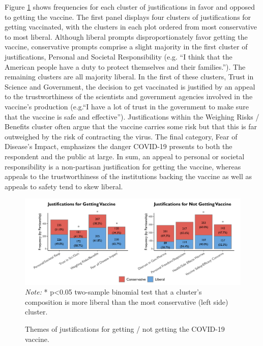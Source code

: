 \documentclass{article} %
\begin{document}
Figure \ref{fig:partisan5} shows frequencies for each cluster of justifications in favor
and opposed to getting the vaccine. The first panel displays four
clusters of justifications for getting vaccinated, with the clusters in
each plot ordered from most conservative to most liberal. Although
liberal prompts disproportionately favor getting the vaccine,
conservative prompts comprise a slight majority in the first cluster of
justifications, Personal and Societal Responsibility (e.g. ``I think
that the American people have a duty to protect themselves and their
families.''). The remaining clusters are all majority liberal. In the
first of these clusters, Trust in Science and Government, the decision
to get vaccinated is justified by an appeal to the trustworthiness of
the scientists and government agencies involved in the vaccine's
production (e.g.``I have a lot of trust in the government to make sure
that the vaccine is safe and effective''). Justifications within the
Weighing Risks / Benefits cluster often argue that the vaccine carries
some risk but that this is far outweighed by the risk of contracting the
virus. The final category, Fear of Disease's Impact, emphasizes the
danger COVID-19 presents to both the respondent and the public at large.
In sum, an appeal to personal or societal responsibility is a
non-partisan justification for getting the vaccine, whereas appeals to
the trustworthiness of the institutions backing the vaccine as well as
appeals to safety tend to skew liberal.

\begin{figure}[H]
  \captionsetup{justification=raggedright,singlelinecheck=false}
  \caption{Themes of justifications for getting / not getting
  the COVID-19 vaccine.}
  \label{fig:partisan5}
  \centering
  \includegraphics[width=\textwidth]{./figures/media/image4.png}
  \smallskip %
  \small %
  \\ \textit{Note:} * p\textless0.05 two-sample binomial test that a cluster's composition is more liberal than the most conservative (left side) cluster. %
\end{figure}
\end{document}
